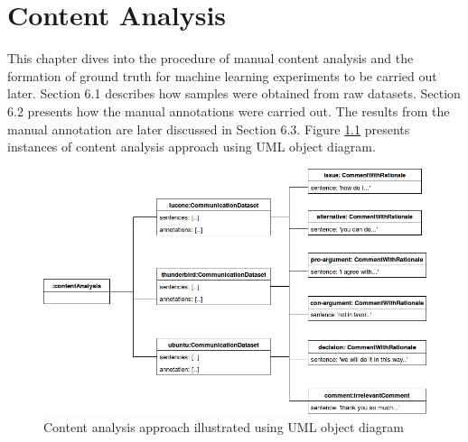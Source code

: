 \documentclass[a4paper,12pt,twoside]{report}
\begin{document}

\chapter{Content Analysis}

This chapter dives into the procedure of manual content analysis and the formation of ground truth for machine learning experiments to be carried out later. Section 6.1 describes how samples were obtained from raw datasets. Section 6.2 presents how the manual annotations were carried out. The results from the manual annotation are later discussed in Section 6.3. Figure  \ref{fig:contentObject} presents instances of content analysis approach using UML object diagram. 

\begin{figure}[h] %
    \centering
    \includegraphics[width=13cm]{content-analysis-object-diagram}
    \caption{Content analysis approach illustrated using UML object diagram}
    \label{fig:contentObject}
\end{figure}
\end{document}
